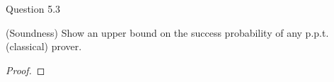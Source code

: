 \begin{solution}{Question 5.3}\label{ques:53}
    \begin{question}
        (Soundness) Show an upper bound on the success probability of any p.p.t. (classical) prover.
    \end{question}
    \tcblower{}
    \begin{proof}
    \end{proof}
\end{solution}
 
